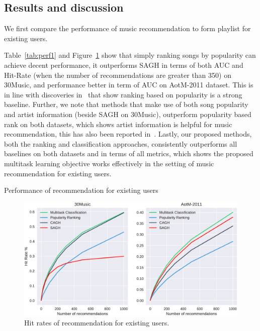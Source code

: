 \subsection{Results and discussion}
We first compare the performance of music recommendation to form playlist for existing users.

Table~\ref{tab:perf1} and Figure~\ref{fig:hr1} show that simply ranking songs by popularity can achieve decent performance,
it outperforms SAGH in terms of both AUC and Hit-Rate (when the number of recommendations are greater than 350) on 30Music,
and performance better in term of AUC on AotM-2011 dataset.
This is in line with discoveries in~\cite{bonnin2013evaluating,jannach2015beyond,bonnin2015automated} that show ranking based on
popularity is a strong baseline.
Further, we note that methods that make use of both song popularity and artist information (beside SAGH on 30Music),
outperform popularity based rank on both datasets, which shows artist information is helpful for music recommendation,
this has also been reported in~\cite{bonnin2013evaluating,bonnin2015automated}.
Lastly, our proposed methods, both the ranking and classification approaches, consistently outperforms all baselines
on both datasets and in terms of all metrics, which shows the proposed multitask learning objective works effectively
in the setting of music recommendation for existing users.

\begin{table}[!h]
\centering
\caption{Performance of recommendation for existing users}
\label{tab:perf1}
\resizebox{\columnwidth}{!}{

}
\end{table}


\begin{figure}[!h]
\centering
\includegraphics[width=\linewidth]{fig/hitrate1.pdf}
\caption{Hit rates of recommendation for existing users.}
\label{fig:hr1}
\end{figure}



